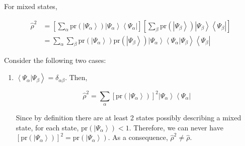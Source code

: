 \documentclass[9pt,handout]{beamer}
\newcommand{\pr}[0]{\text{pr}}
\begin{document}
\begin{frame}{}
For mixed states,

\begin{align*}
\widehat{\rho}^2 & = \left[ \sum_{\alpha} \pr \left( \left\lvert \Psi_\alpha \right\rangle \right) \left\lvert \Psi_\alpha \right\rangle \left\langle \Psi_\alpha \right\rvert \right] \left[ \sum_{\beta} \pr \left( \left\lvert \Psi_\beta \right\rangle \right) \left\lvert \Psi_\beta \right\rangle \left\langle \Psi_\beta \right\rvert \right] \\
& = \sum_\alpha \sum_\beta \pr \left( \left\lvert \Psi_\alpha \right\rangle \right) \pr \left( \left\lvert \Psi_\beta \right\rangle \right) \left\lvert \Psi_\alpha \right\rangle \left\langle \Psi_\alpha \right\rvert \left. \Psi_\beta \right\rangle \left\langle \Psi_\beta \right\rvert
\end{align*}

Consider the following two cases:

\begin{enumerate}
\item $\left\langle \Psi_\alpha \right\rvert \left. \Psi_\beta \right\rangle = \delta_{\alpha \beta}$. Then, 

$$\widehat{\rho}^2 = \sum_\alpha \left[ \pr \left( \left\lvert \Psi_\alpha \right\rangle \right) \right]^2 \left\lvert \Psi_\alpha \right\rangle \left\langle \Psi_\alpha \right\rvert$$

Since by definition there are at least 2 states possibly describing a mixed state, for each state, $\pr \left( \left\lvert \Psi_\alpha \right\rangle \right) < 1$. Therefore, we can never have $\left[ \pr \left( \left\lvert \Psi_\alpha \right\rangle \right) \right]^2 = \pr \left( \left\lvert \Psi_\alpha \right\rangle \right)$. As a consequence, $\widehat{\rho}^2 \neq \widehat{\rho}$.
\end{enumerate}
\end{frame}
\end{document}
